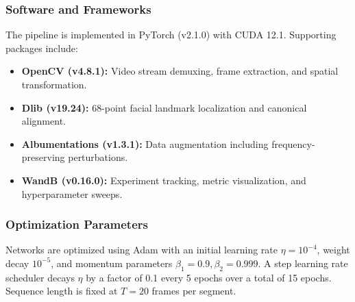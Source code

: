 \subsubsection{Software and Frameworks}
The pipeline is implemented in PyTorch (v2.1.0) with CUDA 12.1. Supporting packages include:
\begin{itemize}
    \item \textbf{OpenCV (v4.8.1):} Video stream demuxing, frame extraction, and spatial transformation.
    \item \textbf{Dlib (v19.24):} 68-point facial landmark localization and canonical alignment.
    \item \textbf{Albumentations (v1.3.1):} Data augmentation including frequency-preserving perturbations.
    \item \textbf{WandB (v0.16.0):} Experiment tracking, metric visualization, and hyperparameter sweeps.
\end{itemize}

\subsubsection{Optimization Parameters}
Networks are optimized using Adam with an initial learning rate $\eta = 10^{-4}$, weight decay $10^{-5}$, and momentum parameters $\beta_1 = 0.9, \beta_2 = 0.999$. A step learning rate scheduler decays $\eta$ by a factor of 0.1 every 5 epochs over a total of 15 epochs. Sequence length is fixed at $T=20$ frames per segment.
